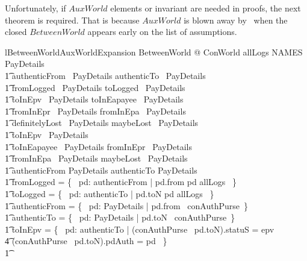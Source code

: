 Unfortunately, if $AuxWorld$ elements or invariant are needed in proofs, the
next theorem is required. That is because $AuxWorld$ is blown away by \zeves\
when the closed $BetweenWorld$ appears early on the list of assumptions.
%
\begin{LNewLemma}
\begin{theorem}{lBetweenWorldAuxWorldExpansion}
    \forall BetweenWorld @ ConWorld \land
            allLogs \in NAMES \rel PayDetails \land \\ \t1
            authenticFrom \in \power~PayDetails \land
            authenticTo \in \power~PayDetails \land \\ \t1
            fromLogged \in \power~PayDetails \land
            toLogged \in \power~PayDetails \land \\ \t1
            toInEpv \in \power~PayDetails \land
            toInEapayee \in \power~PayDetails \land \\ \t1
            fromInEpr \in \power~PayDetails \land
            fromInEpa \in \power~PayDetails \land \\ \t1
            definitelyLost \in \power~PayDetails \land
            maybeLost \in \power~PayDetails \land \\
        \t1
            toInEpv \in \finset~PayDetails \land \\ \t1
            toInEapayee \in \finset~PayDetails \land
            fromInEpr \in \finset~PayDetails \land \\ \t1
            fromInEpa \in \finset~PayDetails \land
            maybeLost \in \finset~PayDetails \land \\ \t1
            authenticFrom \in \finset PayDetails \land
            authenticTo \in \finset PayDetails \land \\ \t1
            fromLogged = \{~ pd: authenticFrom | pd.from \mapsto pd \in allLogs ~\} \land \\ \t1
            toLogged = \{~ pd: authenticTo | pd.toN \mapsto pd \in allLogs ~\} \land \\ \t1
            authenticFrom = \{~ pd: PayDetails | pd.from \in \dom~conAuthPurse~\} \land \\ \t1
            authenticTo = \{~ pd: PayDetails | pd.toN \in \dom~conAuthPurse~\} \land \\ \t1
            toInEpv = \{~ pd: authenticTo | (conAuthPurse~ pd.toN).statuS = epv \\
                    \t4 \land (conAuthPurse~ pd.toN).pdAuth = pd ~\} \land \\ \t1

\end{theorem}
\end{LNewLemma}
